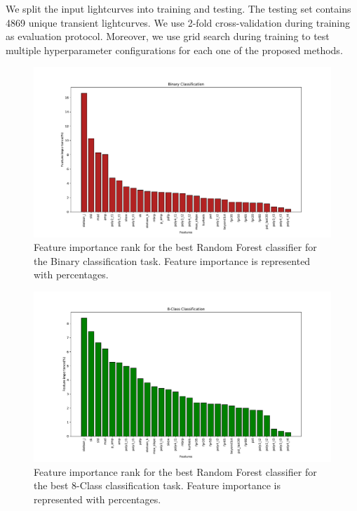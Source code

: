 \documentclass[usenatbib]{mnras}
\begin{document}
We split the input lightcurves into training and testing. 
The testing set contains 4869 unique transient lightcurves.
We use 2-fold cross-validation during training as evaluation
protocol. 
Moreover, we use grid search during training to test multiple 
hyperparameter configurations for each one of the proposed methods.


\begin{figure}
	\includegraphics[width=\textwidth]{binFeatImportance.pdf}
    \caption{Feature importance rank  for the best Random Forest
      classifier for the Binary classification task. 
      Feature importance is represented with percentages.} 
    \label{Importances-Binary}
\end{figure} 

\begin{figure}
	\includegraphics[width=\textwidth]{8classFeatImportance.pdf}
    \caption{Feature importance rank for the best Random Forest
      classifier for the best 8-Class classification task. Feature
      importance is represented with percentages.} 
    \label{Importances-8-Class}
\end{figure}
\end{document}
